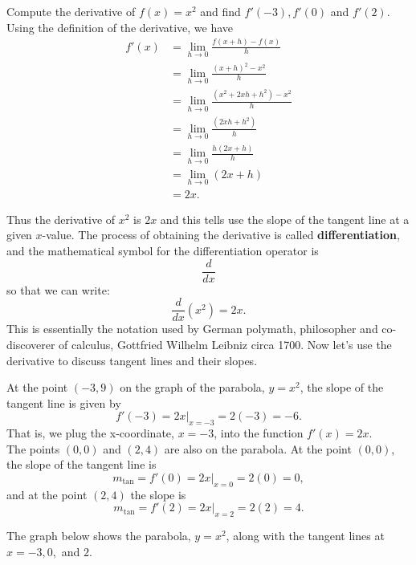 \documentclass[handout]{ximera}
\begin{document}
\begin{example}[example 1]
Compute the derivative of $f(x) = x^2$ and find $f'(-3), f'(0)$ and $f'(2)$.
Using the definition of the derivative, we have
\begin{align*}
f'(x) &= \lim_{h \to 0} \frac{f(x+h)-f(x)}{h}\\[5pt] 
&= \lim_{h \to 0} \frac{(x+h)^2- x^2}{h}\\[5pt] 
&= \lim_{h \to 0} \frac{(x^2 + 2xh + h^2)- x^2}{h} \\[5pt] 
&=  \lim_{h \to 0} \frac{ (2xh + h^2)}{h}\\[5pt] 
&=  \lim_{h \to 0} \frac{ h(2x + h)}{h}\\[5pt] 
&=  \lim_{h \to 0} (2x + h)\\
&= 2x.
\end{align*}

Thus the derivative of $x^2$ is $2x$ and this tells use the slope of the tangent line at a given $x$-value.
The process of obtaining the derivative is called \textbf{differentiation},
and the mathematical symbol for the differentiation operator is
\[
\frac{d}{dx}
\]
so that we can write:
\[
\frac{d}{dx}\left( x^2\right) = 2x.
\]
This is essentially the notation used by German polymath, philosopher and co-discoverer of calculus, 
Gottfried Wilhelm Leibniz circa 1700.
Now let's use the derivative to discuss tangent lines and their slopes.

At the point $(-3, 9)$ on the graph of the parabola, $y = x^2$, the slope of the tangent line is given by 
\[
f'(-3) = 2x\big|_{x=-3} = 2(-3) = -6.
\]
That is, we plug the x-coordinate, $x=-3$, into the function $f'(x) = 2x$.\\
The points $(0,0)$ and $(2,4)$ are also on the parabola. 
At the point $(0,0)$, the slope of the tangent line is 
\[
m_{\text{tan}}= f'(0) =2x\big|_{x=0}= 2(0) = 0,
\]
 and at the point $(2, 4)$ the slope is 
\[
m_{\text{tan}}= f'(2) =2x\big|_{x=2}= 2(2) = 4.
\]

The graph below shows the parabola, $y = x^2$, along with the tangent lines at $x = -3, 0,$ and $2$.


\end{example}
\end{document}
